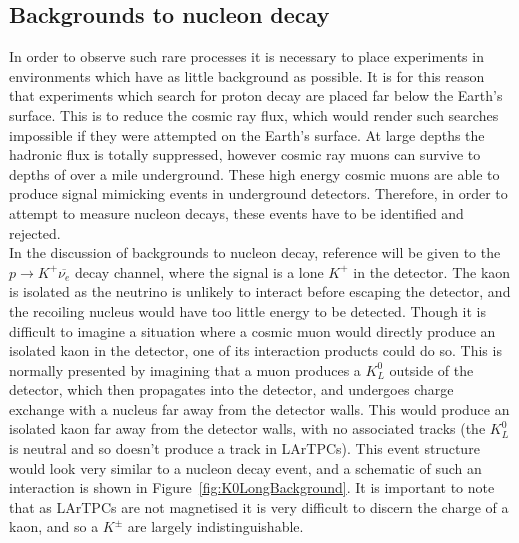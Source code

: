 \subsection{Backgrounds to nucleon decay} \label{sec:BkNDK}  %
In order to observe such rare processes it is necessary to place experiments in environments which have as little background as possible. It is for this reason that experiments which search for proton decay are placed far below the Earth's surface. This is to reduce the cosmic ray flux, which would render such searches impossible if they were attempted on the Earth's surface. At large depths the hadronic flux is totally suppressed, however cosmic ray muons can survive to depths of over a mile underground. These high energy cosmic muons are able to produce signal mimicking events in underground detectors. Therefore, in order to attempt to measure nucleon decays, these events have to be identified and rejected. \\

In the discussion of backgrounds to nucleon decay, reference will be given to the $p \rightarrow K^{+} \overline{\nu_{e}}$ decay channel, where the signal is a lone $K^{+}$ in the detector. The kaon is isolated as the neutrino is unlikely to interact before escaping the detector, and the recoiling nucleus would have too little energy to be detected. Though it is difficult to imagine a situation where a cosmic muon would directly produce an isolated kaon in the detector, one of its interaction products could do so. This is normally presented by imagining that a muon produces a $K^{0}_{L}$ outside of the detector, which then propagates into the detector, and undergoes charge exchange with a nucleus far away from the detector walls. This would produce an isolated kaon far away from the detector walls, with no associated tracks (the $K^{0}_{L}$ is neutral and so doesn't produce a track in LArTPCs). This event structure would look very similar to a nucleon decay event, and a schematic of such an interaction is shown in Figure~\ref{fig:K0LongBackground}. It is important to note that as LArTPCs are not magnetised it is very difficult to discern the charge of a kaon, and so a $K^{\pm}$ are largely indistinguishable. \\

